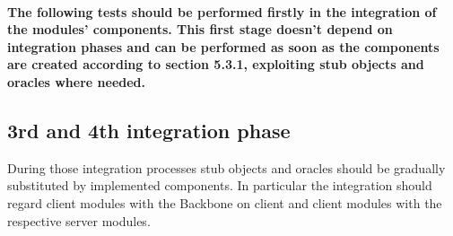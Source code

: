 \paragraph{The following tests should be performed firstly in the integration of the modules' components. This first stage doesn't depend on integration phases and can be performed as soon as the components are created according to section 5.3.1, exploiting stub objects and oracles where needed.}
\subsection{3rd and 4th integration phase}
During those integration processes stub objects and oracles should be gradually substituted by implemented components. In particular the integration should regard client modules with the Backbone on client and client modules with the respective server modules.


